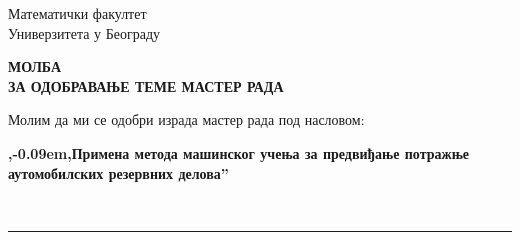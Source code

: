 \documentclass[a4paper]{article}
\def\zn{,\kern-0.09em,}
\begin{document}
\thispagestyle{empty}

\begin{flushleft}
Математички факултет\\
Универзитета у Београду
\end{flushleft}

\bigskip

\begin{center}
\textbf{МОЛБА\\
ЗА ОДОБРАВАЊЕ ТЕМЕ МАСТЕР РАДА
}\end{center}

\bigskip

\begin{flushleft}
Молим да ми се одобри израда мастер рада под насловом:
\end{flushleft}

\begin{minipage}{16.5cm}
\textbf{{\zn  Примена метода машинског учења за предвиђање потражње аутомобилских резервних делова”}}
\end{minipage}\\
\rule[4mm]{17.5cm}{.05mm}
\end{document}
